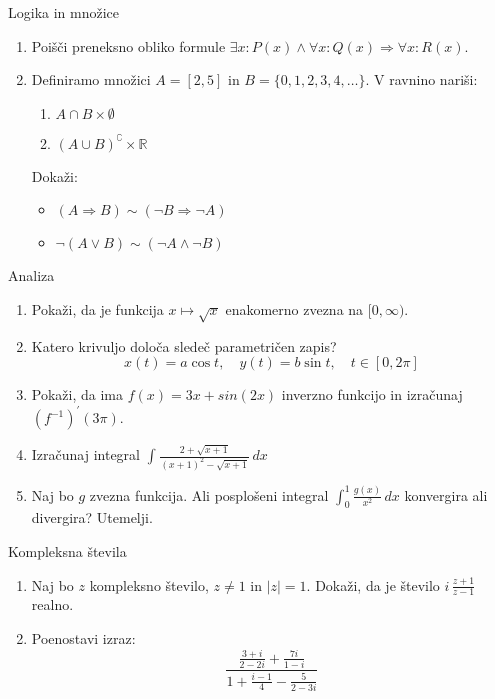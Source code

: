 \begin{frame}{Logika in množice}
	\begin{enumerate}
		\item
		Poišči preneksno obliko formule $\exists x : P(x) \wedge \forall x : Q(x) \Rightarrow \forall x : R(x).$
		\item 
		Definiramo množici $A = [2,5]$ in $B = \{0,1,2,3,4,\dots\}$.
		V ravnino nariši:
		\begin{enumerate}
		   \item $A\cap B \times \emptyset $
		   \item $(A\cup B)^{\complement} \times \mathbb{R}$
		\end{enumerate}
		Dokaži:
		\begin{itemize}
			\item $(A\Rightarrow B) \sim (\lnot B\Rightarrow \lnot A)$
			\item $\lnot (A\lor B) \sim (\lnot A \land \lnot B)$
		\end{itemize}
	\end{enumerate}
\end{frame}

\begin{frame}{Analiza}
	\begin{enumerate}
		\item
		Pokaži, da je funkcija $x\mapsto \sqrt{x}$ enakomerno zvezna na $[0,\infty )$.
		\item 
		Katero krivuljo določa sledeč parametričen zapis?
		$$
		   x(t) = a \cos t,\quad %
		   y(t) = b \sin t,\quad %
		   t \in [0, 2 \pi]
		$$ 
		\item
		Pokaži, da ima $f(x) = 3x + sin(2x)$ inverzno funkcijo in izračunaj $(f^{-1})^\prime(3\pi).$
		
		\item
		Izračunaj integral 
		$\displaystyle \int_{}^{} \frac{2+\sqrt{x+1}}{(x+1)^2-\sqrt{x+1}} \,dx $
		\item 
		Naj bo $g$ zvezna funkcija. Ali posplošeni integral 
		$\int_{0}^{1} \frac{g(x)}{x^2} \,dx $
		konvergira ali divergira? Utemelji.
	\end{enumerate}
\end{frame}

\begin{frame}{Kompleksna števila}
	\begin{enumerate}
		\item
		Naj bo $z$ kompleksno število, $z \ne 1$ in $|z| = 1$.
		Dokaži, da je število \( i \, \frac{z+1}{z-1} \) realno.
		\item
		Poenostavi izraz:
		$$
		\frac{\displaystyle \frac{3 + i}{2 - 2i} + \displaystyle \frac{7i}{1 - i}}{1 + \displaystyle \frac{i - 1}{4} - \displaystyle \frac{5}{2 - 3i}}
		$$
	\end{enumerate}
\end{frame}